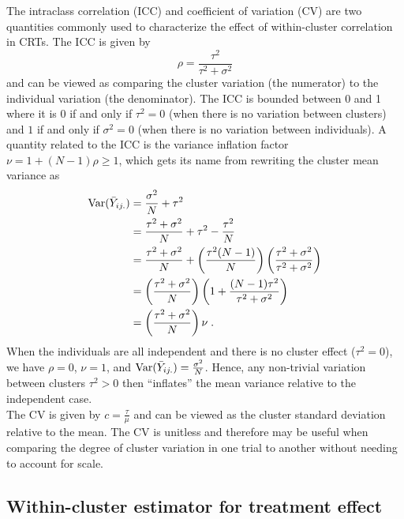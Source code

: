 \documentclass[10pt]{article}
\begin{document}
The intraclass correlation (ICC) and coefficient of variation (CV) are two quantities commonly used to characterize the effect of within-cluster correlation in CRTs. The ICC is given by
\[
\rho = \frac{\tau^2}{\tau^2+\sigma^2}
\]
and can be viewed as comparing the cluster variation (the numerator) to the individual variation (the denominator). The ICC is bounded between 0 and 1 where it is 0 if and only if $\tau^2=0$ (when there is no variation between clusters) and $1$ if and only if $\sigma^2=0$ (when there is no variation between individuals). A quantity related to the ICC is the variance inflation factor $\nu=1+(N-1)\rho\geq1$, which gets its name from rewriting the cluster mean variance as
\begin{align*}
\mathrm{Var}(\bar{Y}_{ij.}) &= \frac{\sigma^2}{N} + \tau^2 \\
&= \frac{\tau^2+\sigma^2}{N} + \tau^2 - \frac{\tau^2}{N} \\
&= \frac{\tau^2+\sigma^2}{N} + \left(\frac{\tau^2(N-1)}{N}\right)\left(\frac{\tau^2+\sigma^2}{\tau^2+\sigma^2}\right) \\
&= \left(\frac{\tau^2+\sigma^2}{N}\right)\left(1+\frac{(N-1)\tau^2}{\tau^2+\sigma^2}\right) \\
&= \left(\frac{\tau^2+\sigma^2}{N}\right)\nu \;.
\end{align*}
When the individuals are all independent and there is no cluster effect ($\tau^2=0$), we have $\rho=0$, $\nu=1$, and $\mathrm{Var}(\bar{Y}_{ij.})=\frac{\sigma^2}{N}$. Hence, any non-trivial variation between clusters $\tau^2>0$ then ``inflates'' the mean variance relative to the independent case.
\\

The CV is given by $c=\frac{\tau}{\mu}$ and can be viewed as the cluster standard deviation relative to the mean. The CV is unitless and therefore may be useful when comparing the degree of cluster variation in one trial to another without needing to account for scale.

\subsection{Within-cluster estimator for treatment effect} \label{apx:estimator}
\end{document}

